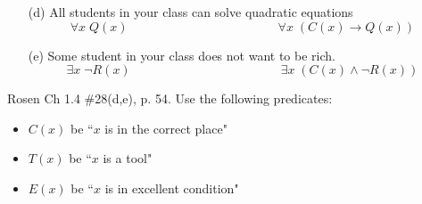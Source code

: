 \documentclass[12pt,addpoints]{exam}
\newcommand{\ra}{\rightarrow}
\begin{document}
\begin{questions}
\begin{solution}
\begin{itemize}
        \item[(d)] All students in your class can solve quadratic equations
        $$ \forall x\; Q(x) \hspace{2in} \forall x\; (C(x) \ra Q(x))$$
        \item[(e)] Some student in your class does not want to be rich.
        $$ \exists x\; \neg R(x) \hspace{2in} \exists x\; (C(x) \wedge \neg R(x))$$
    \end{itemize}
    \end{solution}

\question Rosen Ch 1.4 \#28(d,e), p. 54.
Use the following predicates:
\begin{itemize}
    \item $C(x)$ be ``$x$ is in the correct place"
    \item $T(x)$ be ``$x$ is a tool"
    \item $E(x)$ be ``$x$ is in excellent condition"
\end{itemize}
    \begin{solution}

\end{solution}
\end{questions}
\end{document}
